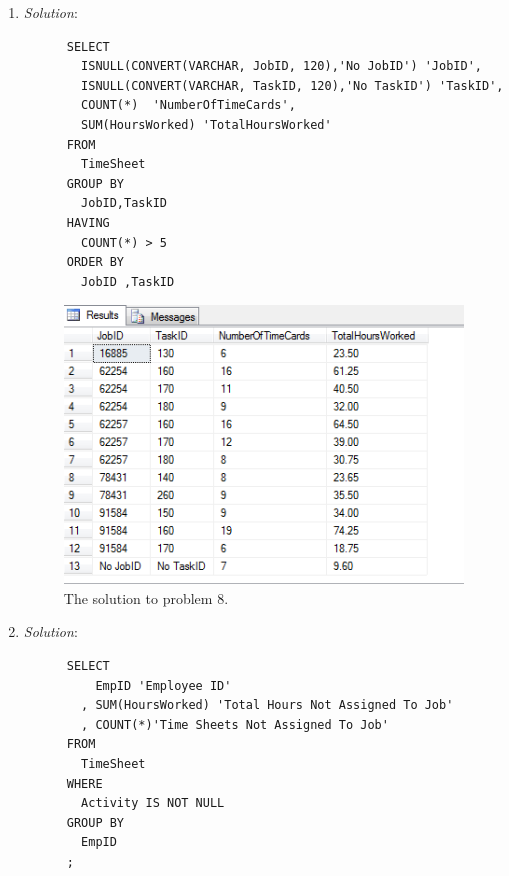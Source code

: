 \documentclass{article}
\begin{document}
\begin{enumerate}
  \newpage
  \item %
  \textit{Solution}:
  \begin{verbatim}
      SELECT 
        ISNULL(CONVERT(VARCHAR, JobID, 120),'No JobID') 'JobID',
        ISNULL(CONVERT(VARCHAR, TaskID, 120),'No TaskID') 'TaskID',
        COUNT(*)  'NumberOfTimeCards',
        SUM(HoursWorked) 'TotalHoursWorked'
      FROM 
        TimeSheet
      GROUP BY
        JobID,TaskID
      HAVING 
        COUNT(*) > 5
      ORDER BY
        JobID ,TaskID
  \end{verbatim}

  \begin{figure}[h!]
    \centering
    \includegraphics[width=.5\linewidth]{QueryResults/HW04_Problem08_query}
    \caption{The solution to problem 8.}
    \label{fig:HW04_Problem08}
  \end{figure}

  \newpage
  \item %

  \textit{Solution}:
  \begin{verbatim}
      SELECT
          EmpID 'Employee ID'
        , SUM(HoursWorked) 'Total Hours Not Assigned To Job'
        , COUNT(*)'Time Sheets Not Assigned To Job'
      FROM
        TimeSheet
      WHERE
        Activity IS NOT NULL
      GROUP BY
        EmpID
      ;
  \end{verbatim}


\end{enumerate}
\end{document}
